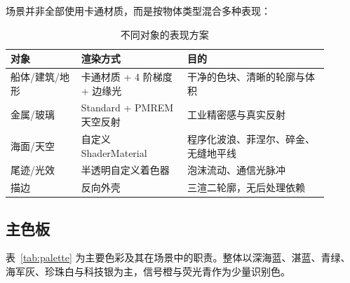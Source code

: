 \documentclass[UTF8, a4paper, 11pt]{ctexart}
\begin{document}
场景并非全部使用卡通材质，而是按物体类型混合多种表现：

\begin{table}[H]
\centering
\caption{不同对象的表现方案}
\label{tab:art}
\small
\begin{tabular}{@{}p{0.20\linewidth}p{0.30\linewidth}p{0.40\linewidth}@{}}
\toprule
\textbf{对象} & \textbf{渲染方式} & \textbf{目的} \\
\midrule
船体/建筑/地形 & 卡通材质 + 4 阶梯度 + 边缘光 & 干净的色块、清晰的轮廓与体积 \\
金属/玻璃 & Standard + PMREM 天空反射 & 工业精密感与真实反射 \\
海面/天空 & 自定义 ShaderMaterial & 程序化波浪、菲涅尔、碎金、无缝地平线 \\
尾迹/光效 & 半透明自定义着色器 & 泡沫流动、通信光脉冲 \\
描边 & 反向外壳 & 三渲二轮廓，无后处理依赖 \\
\bottomrule
\end{tabular}
\end{table}

\subsection{主色板}

表~\ref{tab:palette} 为主要色彩及其在场景中的职责。整体以深海蓝、湛蓝、青绿、海军灰、珍珠白与科技银为主，信号橙与荧光青作为少量识别色。
\end{document}
